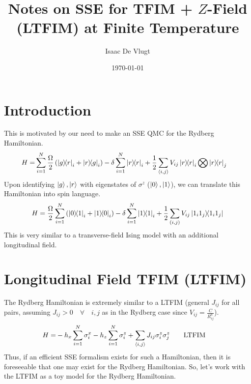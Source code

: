 \documentclass[12pt]{article}
\title{Notes on SSE for TFIM + $Z$-Field (LTFIM) at Finite Temperature}
\author{Isaac De Vlugt}
\date{\today}
\begin{document}
\maketitle

\section{Introduction}

This is motivated by our need to make an SSE QMC for the Rydberg Hamiltonian.
\begin{align}
    H = & \sum_{i=1}^N \frac{\Omega}{2} \left(\ketbra{g}{r}_i + \ketbra{r}{g}_i\right) - \delta \sum_{i=1}^N \ketbra{r}{r}_i + \frac{1}{2} \sum_{\langle i,j \rangle} V_{ij} \ketbra{r}{r}_i \bigotimes \ketbra{r}{r}_j
\end{align}
Upon identifying $\ket{g},\ket{r}$ with eigenstates of $\sigma^z$ ($\ket{0},\ket{1}$), we can translate this Hamiltonian into spin language.
\begin{align}
    H = \frac{\Omega}{2} \sum_{i=1}^N \left( \ketbra{0}{1}_i + \ketbra{1}{0}_i \right) - \delta \sum_{i=1}^N \ketbra{1}{1}_i + \frac{1}{2} \sum_{(i,j)} V_{ij} \ketbra{1_i 1_j}{1_i 1_j}
\end{align}
This is very similar to a transverse-field Ising model with an additional longitudinal field.

\section{Longitudinal Field TFIM (LTFIM)}

The Rydberg Hamiltonian is extremely similar to a LTFIM (general $J_{ij}$ for all pairs, assuming $J_{ij} > 0 \quad \forall \quad i,j$ as in the Rydberg case since $V_{ij} = \frac{C}{R_{ij}^6}$).
\begin{align} \label{eq:LTFIM_hamiltonian}
    H = & - h_x \sum_{i = 1}^N \sigma^x_i - h_z \sum_{i=1}^N \sigma_i^z + \sum_{\expval{i,j}} J_{ij} \sigma_i^z \sigma_j^z \qquad \mathrm{LTFIM}
\end{align}
Thus, if an efficient SSE formalism exists for such a Hamiltonian, then it is foreseeable that one may exist for the Rydberg Hamiltonian. So, let's work with the LTFIM as a toy model for the Rydberg Hamiltonian.
\end{document}
